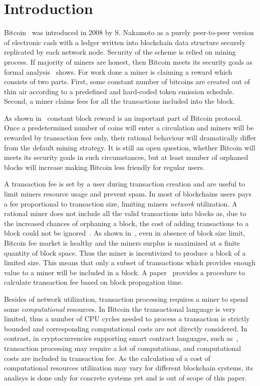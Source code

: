 \documentclass[]{llncs}   %
\begin{document}
\section{Introduction}

Bitcoin~\cite{Nakamoto2008} was introduced in 2008 by S. Nakamoto as a purely
peer-to-peer version of electronic cash with a ledger written into blockchain
data structure securely replicated by each network node. Security of the scheme
is relied on mining process. If majority of miners are honest, then Bitcoin
meets its security goals as formal analysis~\cite{Garay2015} shows. For work
done a miner is claiming a reward which consists of two parts. First, some
constant number of bitcoins are created out of thin air according to a
predefined and hard-coded token emission schedule. Second, a miner claims fees
for all the transactions included into the block.

As shown in~\cite{carlsten2016instability} constant block reward is an important
part of Bitcoin protocol. Once a predetermined number of coins will enter a circulation
and miners will be rewarded by transaction fees only, their rational behaviour will
dramatically differ from the default mining strategy. It is still an open question, whether
Bitcoin will meets its security goals in such circumstances, but at least number of
orphaned blocks will increase making Bitcoin less friendly for regular users.

A transaction fee is set by a user during transaction creation and are
useful to limit miners resource usage and prevent spam. In most of
blockchains users pays a fee proportional to transaction size,
limiting miners {\em network} utilization. A rational miner does not
include all the valid transactions into blocks as, due to the increased
chances of orphaning a block, the cost of adding transactions to a block
could not be ignored~\cite{andersen2013,rizun2015transaction}. As shown
in~\cite{rizun2015transaction}, even in absence of block size limit,
Bitcoin fee market is healthy and the miners surplus is maximized at a
finite quantity of block space. Thus the miner is incentivized to produce
a block of a limited size. This means that only a subset of transactions
which provides enough value to a miner will be included in a block. A
paper~\cite{rizun2015transaction} provides a procedure to calculate
transaction fee based on block propagation time.

Besides of network utilization, transaction processing requires a miner
to spend some {\em computational} resources.
In Bitcoin the transactional language\cite{script} is very limited, thus
a number of CPU cycles needed to process a transaction
is strictly bounded and corresponding computational costs are not directly
considered. In contrast, in cryptocurrencies supporting smart contract
languages, such as~\cite{seijas2016scripting,tezosScript,solidity},
transaction processing may require a lot of computations, and
computational costs are included in transaction fee. As the calculation
of a cost of computational resources utilization may vary for different
blockchain systems, its analisys is done only for concrete systems yet
\cite{Earlz2017,luu2015demystifying} and is out of scope of this paper.
\end{document}
